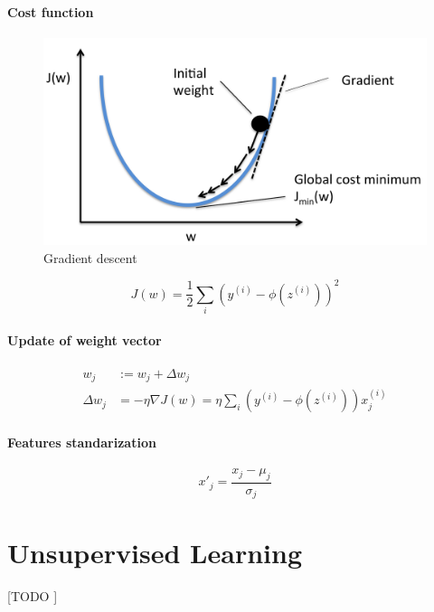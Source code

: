 \documentclass{article}
\begin{document}
			\paragraph{Cost function}
			
			\begin{figure}
				\centering
				\includegraphics[scale=.1]{gradient-descend}
				\caption{Gradient descent}
				\label{fig:gradient-descend}
			\end{figure}
						
			\begin{equation*}
				J(w) = \frac{1}{2} \sum_i (y^{(i)}-\phi(z^{(i)}))^2
			\end{equation*}
			
			\paragraph{Update of weight vector}
			
			\begin{equation*}
				\begin{aligned}
					w_j &:= w_j + \Delta w_j \\
					\Delta w_j &= -\eta\nabla J(w) = \eta\sum_i (y^{(i)} -\phi(z^{(i)}))x^{(i)}_j
				\end{aligned}
			\end{equation*}
			
			\paragraph{Features standarization}
			
			\begin{equation*}
				x'_j = \frac{x_j - \mu_j}{\sigma_j}
			\end{equation*}
			
			\vspace{2cm}
			

	\section{Unsupervised Learning}
	\label{sec:unsupervised-learning}

			\paragraph{}
			[TODO ]


	\nocite{subject:taa}
	\nocite{packt:py-machine-learning}

  
  
\end{document}
